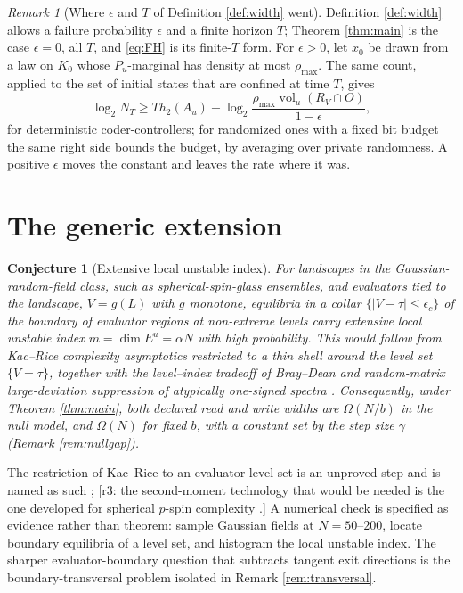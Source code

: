 \documentclass[11pt]{article}
\newtheorem{conjecture}{Conjecture}[section]
\theoremstyle{definition}
\theoremstyle{remark}
\newtheorem{remark}{Remark}[section]
\newcommand{\RV}{R_V}
\newcommand{\Eu}{E^u}
\newcommand{\Pu}{P_u}
\newcommand{\Au}{A_u}
\newcommand{\htwo}{h_2}
\newcommand{\volu}{\operatorname{vol}_u}
\newcommand{\revnote}[1]{\textcolor{red!60!black}{[r3: #1]}}
\begin{document}
\begin{remark}[Where $\epsilon$ and $T$ of Definition \ref{def:width} went]\label{rem:epsT}
Definition \ref{def:width} allows a failure probability $\epsilon$ and a finite horizon $T$; Theorem \ref{thm:main} is the case $\epsilon=0$, all $T$, and \eqref{eq:FH} is its finite-$T$ form. For $\epsilon>0$, let $x_0$ be drawn from a law on $K_0$ whose $\Pu$-marginal has density at most $\rho_{\max}$. The same count, applied to the set of initial states that are confined at time $T$, gives
\begin{equation*}
\log_2N_T\ge T\htwo(\Au)-\log_2\frac{\rho_{\max}\volu(\RV\cap O)}{1-\epsilon},
\end{equation*}
for deterministic coder-controllers; for randomized ones with a fixed bit budget the same right side bounds the budget, by averaging over private randomness. A positive $\epsilon$ moves the constant and leaves the rate where it was.
\end{remark}

\section{The generic extension}

\begin{conjecture}[Extensive local unstable index]\label{conj:index}
For landscapes in the Gaussian-random-field class, such as spherical-spin-glass ensembles, and evaluators tied to the landscape, $V=g(L)$ with $g$ monotone, equilibria in a collar $\{|V-\tau|\le\epsilon_c\}$ of the boundary of evaluator regions at non-extreme levels carry extensive local unstable index $m=\dim\Eu=\alpha N$ with high probability. This would follow from Kac--Rice complexity asymptotics restricted to a thin shell around the level set $\{V=\tau\}$, together with the level--index tradeoff of Bray--Dean \cite{bray2007} and random-matrix large-deviation suppression of atypically one-signed spectra \cite{dean2006}. Consequently, under Theorem \ref{thm:main}, both declared read and write widths are $\Omega(N/b)$ in the null model, and $\Omega(N)$ for fixed $b$, with a constant set by the step size $\gamma$ (Remark \ref{rem:nullgap}).
\end{conjecture}

The restriction of Kac--Rice to an evaluator level set is an unproved step and is named as such \cite{bray2007,auffinger2013}; \revnote{the second-moment technology that would be needed is the one developed for spherical $p$-spin complexity \cite{subag2017,fyodorov2007}.} A numerical check is specified as evidence rather than theorem: sample Gaussian fields at $N=50$--$200$, locate boundary equilibria of a level set, and histogram the local unstable index. The sharper evaluator-boundary question that subtracts tangent exit directions is the boundary-transversal problem isolated in Remark \ref{rem:transversal}.
\end{document}
